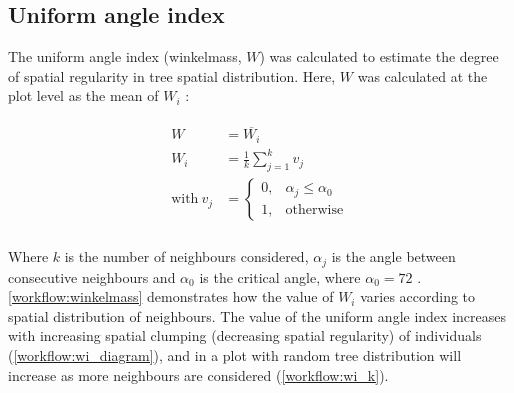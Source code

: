 \begin{refsection}
\subsection{Uniform angle index}

The uniform angle index (winkelmass, $W$) was calculated to estimate the degree of spatial regularity in tree spatial distribution. Here, $W$ was calculated at the plot level as the mean of $W_{i}$ \citep{Gadow2002}: 

\begin{align}
\begin{split}
	W &= \overline{W_{i}} \\
	W_{i} &= \frac{1}{k} \sum_{j=1}^{k} v_{j} \\
	\text{with}\ v_{j} &= \begin{cases}
		0,& \alpha_{j} \le \alpha_{0} \\
		1,& \text{otherwise}
	\end{cases} \\
\end{split}
\end{align}

Where $k$ is the number of neighbours considered, $\alpha_{j}$ is the angle between consecutive neighbours and $\alpha_{0}$ is the critical angle, where $\alpha_{0} = 72$\textdegree{} \citep{Hui2002}. \autoref{workflow:winkelmass} demonstrates how the value of $W_{i}$ varies according to spatial distribution of neighbours. The value of the uniform angle index increases with increasing spatial clumping (decreasing spatial regularity) of individuals (\autoref{workflow:wi_diagram}), and in a plot with random tree distribution will increase as more neighbours are considered (\autoref{workflow:wi_k}). 


\end{refsection}

